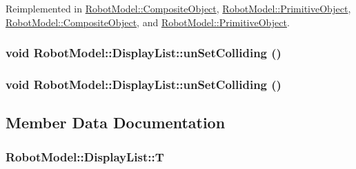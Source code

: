 Reimplemented in \hyperlink{class_robot_model_1_1_composite_object_afd942b7fa3b18bcc01c3fba417a6c027}{RobotModel::CompositeObject}, \hyperlink{class_robot_model_1_1_primitive_object_ae41a1dcacd77b59c44409a77b0183a77}{RobotModel::PrimitiveObject}, \hyperlink{class_robot_model_1_1_composite_object_a7704da6de6211738327170423c1a3d83}{RobotModel::CompositeObject}, and \hyperlink{class_robot_model_1_1_primitive_object_aeddf2c45f6a3d60f2566e58728cc2a96}{RobotModel::PrimitiveObject}.\hypertarget{class_robot_model_1_1_display_list_a7440037838409ae852e02183245b338d}{
\subsubsection[{unSetColliding}]{\setlength{\rightskip}{0pt plus 5cm}void RobotModel::DisplayList::unSetColliding ()}}
\label{class_robot_model_1_1_display_list_a7440037838409ae852e02183245b338d}
\hypertarget{class_robot_model_1_1_display_list_a7440037838409ae852e02183245b338d}{
\subsubsection[{unSetColliding}]{\setlength{\rightskip}{0pt plus 5cm}void RobotModel::DisplayList::unSetColliding ()}}
\label{class_robot_model_1_1_display_list_a7440037838409ae852e02183245b338d}


\subsection{Member Data Documentation}
\hypertarget{class_robot_model_1_1_display_list_a9058babda6102fe41186f806990aa350}{
\subsubsection[{T}]{ {\bf RobotModel::DisplayList::T}}}
\label{class_robot_model_1_1_display_list_a9058babda6102fe41186f806990aa350}


